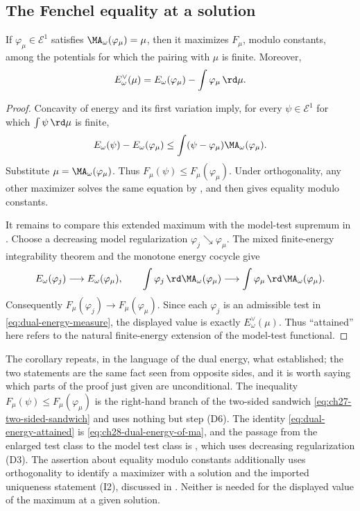 \subsection{The Fenchel equality at a solution}
\label{sec:ch28-fenchel-equality}

\begin{corollary}
\label{cor:finite-energy-variational-characterization}
If $\varphi_\mu\in\mathcal E^1$ satisfies
$\MA_\omega(\varphi_\mu)=\mu$, then it maximizes $F_\mu$, modulo
constants, among the potentials for which the pairing with $\mu$ is
finite.  Moreover,
\begin{equation}
\label{eq:dual-energy-attained}
 E_\omega^\vee(\mu)
 =E_\omega(\varphi_\mu)-
      \int\varphi_\mu\,\rd \mu.
\end{equation}
\end{corollary}

\begin{proof}
Concavity of energy and its first variation imply, for every
$\psi\in\mathcal E^1$ for which $\int\psi\,\rd \mu$ is finite,
\[
 E_\omega(\psi)-E_\omega(\varphi_\mu)
 \leq\int(\psi-\varphi_\mu)\MA_\omega(\varphi_\mu).
\]
Substitute $\mu=\MA_\omega(\varphi_\mu)$.  Thus
$F_\mu(\psi)\leq F_\mu(\varphi_\mu)$.  Under orthogonality, any other
maximizer solves the same equation by
, and
\cite[Proposition~8.2]{BFJ15} then gives equality modulo constants.

It remains to compare this extended maximum with the model-test supremum
in .  Choose a decreasing model
regularization $\varphi_j\searrow\varphi_\mu$.  The mixed
finite-energy integrability theorem and the monotone energy cocycle give
\[
 E_\omega(\varphi_j)\longrightarrow E_\omega(\varphi_\mu),
 \qquad
 \int\varphi_j\,\rd \MA_\omega(\varphi_\mu)
   \longrightarrow
 \int\varphi_\mu\,\rd \MA_\omega(\varphi_\mu).
\]
Consequently $F_\mu(\varphi_j)\to F_\mu(\varphi_\mu)$.  Since each
$\varphi_j$ is an admissible test in
\eqref{eq:dual-energy-measure}, the displayed value is exactly
$E_\omega^\vee(\mu)$.  Thus ``attained'' here refers to the natural
finite-energy extension of the model-test functional.
\end{proof}

The corollary repeats, in the language of the dual energy, what
 established; the two statements are the
same fact seen from opposite sides, and it is worth saying which parts of
the proof just given are unconditional.  The inequality
$F_\mu(\psi)\leq F_\mu(\varphi_\mu)$ is the right-hand branch of the
two-sided sandwich \eqref{eq:ch27-two-sided-sandwich} and uses nothing but
step \textup{(D6)}.  The identity \eqref{eq:dual-energy-attained} is
\eqref{eq:ch28-dual-energy-of-ma}, and the passage from the enlarged test
class to the model test class is , which uses
decreasing regularization \textup{(D3)}.  The assertion about equality modulo constants additionally uses
orthogonality to identify a maximizer with a solution and the imported
uniqueness statement \textup{(I2)}, discussed in
.  Neither is needed for the displayed value
of the maximum at a given solution.


